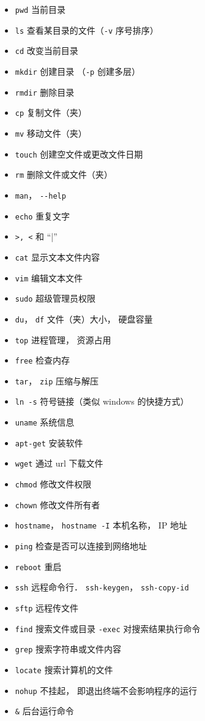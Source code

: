 \begin{itemize}
\item \verb|pwd| 当前目录
\item \verb|ls| 查看某目录的文件（\verb|-v| 序号排序）
\item \verb|cd| 改变当前目录
\item \verb|mkdir| 创建目录 （\verb|-p| 创建多层）
\item \verb|rmdir| 删除目录
\item \verb|cp| 复制文件（夹）
\item \verb|mv| 移动文件（夹）
\item \verb|touch| 创建空文件或更改文件日期
\item \verb|rm| 删除文件或文件（夹）
\item \verb|man|， \verb|--help|
\item \verb|echo| 重复文字
\item \verb|>, <| 和 “|”
\item \verb|cat| 显示文本文件内容
\item \verb|vim| 编辑文本文件
\item \verb|sudo| 超级管理员权限
\item \verb|du|， \verb|df| 文件（夹）大小， 硬盘容量
\item \verb|top| 进程管理， 资源占用
\item \verb|free| 检查内存
\item \verb|tar|， \verb|zip| 压缩与解压
\item \verb|ln -s| 符号链接（类似 windows 的快捷方式）
\item \verb|uname| 系统信息
\item \verb|apt-get| 安装软件
\item \verb|wget| 通过 url 下载文件
\item \verb|chmod| 修改文件权限
\item \verb|chown| 修改文件所有者
\item \verb|hostname|， \verb|hostname -I| 本机名称， IP 地址
\item \verb|ping| 检查是否可以连接到网络地址
\item \verb|reboot| 重启
\item \verb|ssh| 远程命令行． \verb|ssh-keygen|， \verb|ssh-copy-id|
\item \verb|sftp| 远程传文件
\item \verb|find| 搜索文件或目录 \verb|-exec| 对搜索结果执行命令
\item \verb|grep| 搜索字符串或文件内容
\item \verb|locate| 搜索计算机的文件
\item \verb|nohup| 不挂起， 即退出终端不会影响程序的运行
\item \verb|&| 后台运行命令
\end{itemize}


